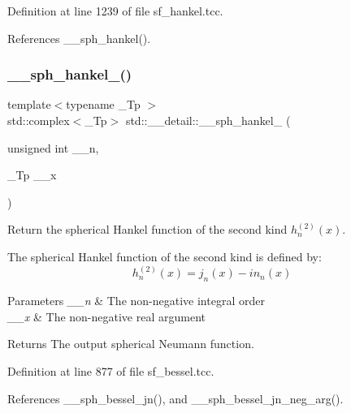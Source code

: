 Definition at line 1239 of file sf\+\_\+hankel.\+tcc.



References \+\_\+\+\_\+sph\+\_\+hankel().

\mbox{\label{namespacestd_1_1____detail_a89fe914f377a138d37369d13bda1162e}} 
\subsubsection{\texorpdfstring{\+\_\+\+\_\+sph\+\_\+hankel\+\_()}{\_\_sph\_hankel\_2()}\hspace{0.1cm}{\footnotesize\ttfamily [1/2]}}
{\footnotesize\ttfamily template$<$typename \+\_\+\+Tp $>$ \\
std\+::complex$<$\+\_\+\+Tp$>$ std\+::\+\_\+\+\_\+detail\+::\+\_\+\+\_\+sph\+\_\+hankel\+\_ (\begin{DoxyParamCaption}\item[{unsigned int}]{\+\_\+\+\_\+n,  }\item[{\+\_\+\+Tp}]{\+\_\+\+\_\+x }\end{DoxyParamCaption})}



Return the spherical Hankel function of the second kind $ h^{(2)}_n(x) $. 

The spherical Hankel function of the second kind is defined by\+: \[ h^{(2)}_n(x) = j_n(x) - i n_n(x) \]


\begin{DoxyParams}{Parameters}
{\em \+\_\+\+\_\+n} & The non-\/negative integral order \\
\hline
{\em \+\_\+\+\_\+x} & The non-\/negative real argument \\
\hline
\end{DoxyParams}
\begin{DoxyReturn}{Returns}
The output spherical Neumann function. 
\end{DoxyReturn}


Definition at line 877 of file sf\+\_\+bessel.\+tcc.



References \+\_\+\+\_\+sph\+\_\+bessel\+\_\+jn(), and \+\_\+\+\_\+sph\+\_\+bessel\+\_\+jn\+\_\+neg\+\_\+arg().


